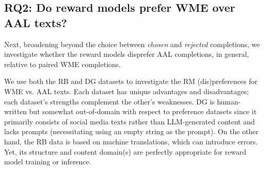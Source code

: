 \subsection{RQ2: Do reward models prefer WME over AAL texts?}
\label{RQ2}
Next, broadening beyond the choice between \textit{chosen} and  \textit{rejected} completions, we investigate whether the reward models disprefer AAL completions, in general, relative to paired WME completions. 

We use both the \textsc{RB} and \textsc{DG} datasets to investigate the RM (dis)preferences for WME vs. AAL texts. Each dataset has unique advantages and disadvantages; each dataset's strengths complement the other's weaknesses. \textsc{DG} is human-written but somewhat out-of-domain with respect to preference datasets since it primarily consists of social media texts rather than LLM-generated content and lacks prompts (necessitating using an empty string as the prompt). On the other hand, the \textsc{RB} data is based on machine translations, which can introduce errors. Yet, its structure and content domain(s) are perfectly appropriate for reward model training or inference.

